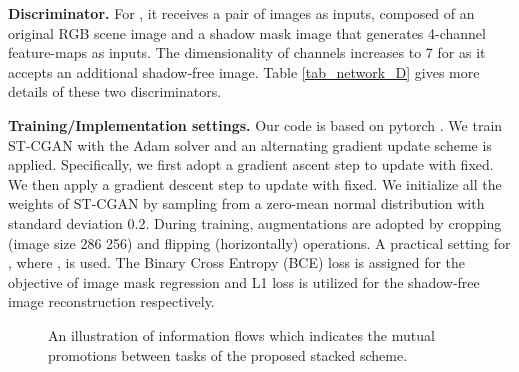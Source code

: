 \documentclass[10pt,twocolumn,letterpaper]{article}
\begin{document}
\noindent \textbf{Discriminator.} For , it receives a pair of images as inputs, composed of an original RGB scene image and a shadow mask image that generates 4-channel feature-maps as inputs. The dimensionality of channels increases to 7 for  as it accepts an additional shadow-free image. Table \ref{tab_network_D} gives more details of these two discriminators.



\noindent \textbf{Training/Implementation settings.} Our code is based on pytorch \cite{ketkar2017introduction}. We train ST-CGAN with the Adam solver \cite{kingma2014adam} and an alternating gradient update scheme is applied. Specifically, we first adopt a gradient ascent step to update 
with  fixed. We then apply a gradient descent step to update 
with  fixed. We initialize all the weights of ST-CGAN by sampling from a zero-mean normal distribution with standard deviation 0.2. During training, augmentations are adopted by cropping (image size 286  256) and flipping (horizontally) operations. A practical setting for , where , is used. The Binary Cross Entropy (BCE) loss is assigned for the objective of image mask regression and L1 loss is utilized for the shadow-free image reconstruction respectively.

\begin{figure}[t]
	\begin{center}
		\setlength{\fboxrule}{0pt}
	\end{center}
	\vspace{-5pt}
	\caption{An illustration of information flows which indicates the mutual promotions between tasks of the proposed stacked scheme.}
	\label{fig_flow_cropped}
	\vspace{-5pt}
\end{figure}
\end{document}
